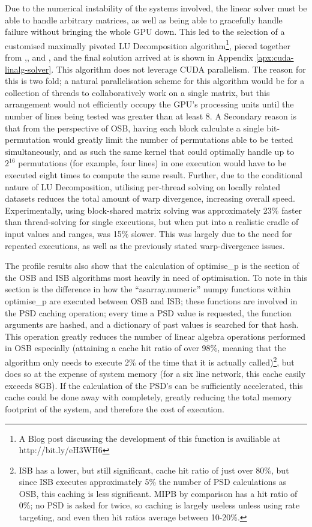 Due to the numerical instability of the systems involved, the linear solver must be able to handle arbitrary matrices, as well as being able to gracefully handle failure without bringing the whole GPU down. This led to the selection of a customised maximally pivoted LU Decomposition algorithm\footnote{A Blog post discussing the development of this function is availiable at http://bit.ly/eH3WH6}, pieced together from \cite{WHP92},\cite{GR10}, \cite{JDJZW03} and \cite{GOU96}, and the final solution arrived at is shown in Appendix \ref{apx:cuda-linalg-solver}. This algorithm does not leverage CUDA parallelism. The reason for this is two fold; a natural parallelisation scheme for this algorithm would be for a collection of threads to collaboratively work on a single matrix, but this arrangement would not efficiently occupy the GPU's processing units until the number of lines being tested was greater than at least 8. A Secondary reason is that from the perspective of OSB, having each block calculate a single bit-permutation would greatly limit the number of permutations able to be tested simultaneously, and as such the same kernel that could optimally handle up to \(2^{16}\) permutations (for example, four lines) in one execution would have to be executed eight times to compute the same result. Further, due to the conditional nature of LU Decomposition, utilising per-thread solving on locally related datasets reduces the total amount of warp divergence, increasing overall speed. Experimentally, using block-shared matrix solving was approximately 23\% faster than thread-solving for single executions, but when put into a realistic cradle of input values and ranges, was 15\% slower. This was largely due to the need for repeated executions, as well as the previously stated warp-divergence issues.

The profile results also show that the calculation of optimise\_p is the section of the OSB and ISB algorithms most heavily in need of optimisation. To note in this section is the difference in how the ``asarray.numeric'' numpy functions within optimise\_p are executed between OSB and ISB; these functions are involved in the PSD caching operation; every time a PSD value is requested, the function arguments are hashed, and a dictionary of past values is searched for that hash. This operation greatly reduces the number of linear algebra operations performed in OSB especially (attaining a cache hit ratio of over 98\%, meaning that the algorithm only needs to execute 2\% of the time that it is actually called)\footnote{ISB has a lower, but still significant, cache hit ratio of just over 80\%, but since ISB executes approximately 5\% the number of PSD calculations as OSB, this caching is less significant. MIPB by comparison has a hit ratio of 0\%; no PSD is asked for twice, so caching is largely useless unless using rate targeting, and even then hit ratios average between 10-20\%.}, but does so at the expense of system memory (for a six line network, this cache easily exceeds 8GB). If the calculation of the PSD's can be sufficiently accelerated, this cache could be done away with completely, greatly reducing the total memory footprint of the system, and therefore the cost of execution.

